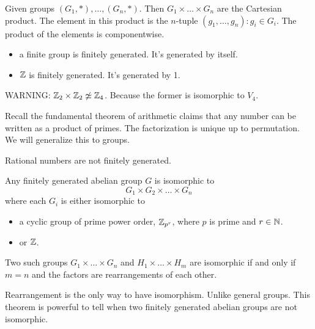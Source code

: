 \documentclass[class=article,crop=false]{standalone}
\begin{document}
\begin{defn}
	Given groups $ (G_1,*), \ldots, (G_n,*)$. Then $ G_1 \times \ldots \times G_n$ are the Cartesian product. The element in this product is the $ n$-tuple $ (g_1,\ldots,g_n): g_i \in G_i$. The product of the elements is componentwise. 
\end{defn}

\begin{note}[]
	\begin{itemize}
		\item a finite group is finitely generated. It's generated by itself.
		\item $ \mathbb{Z}$ is finitely generated. It's generated by 1.
	\end{itemize}
\end{note}

WARNING: $ \mathbb{Z}_2 \times \mathbb{Z}_2 \not \simeq \mathbb{Z}_4$. Because the former is isomorphic to $ V_4$.

Recall the fundamental theorem of arithmetic claims that any number can be written as a product of primes. The factorization is unique up to permutation. We will generalize this to groups.

\begin{note}[]
	Rational numbers are not finitely generated.
\end{note}
\begin{thm}
	Any finitely generated abelian group $ G$ is isomorphic to
	 \[
	G_1 \times G_2 \times \ldots \times G_n
	\] 
	where each $ G_i$ is either isomorphic to
	\begin{itemize}
		\item a cyclic group of prime power order, $ \mathbb{Z}_{p^r}$, where $ p$ is prime and  $ r \in \mathbb{N}$.
		\item or $ \mathbb{Z}$.
	\end{itemize}
	Two such groups $ G_1 \times \ldots \times G_n$ and $ H_1 \times \ldots \times H_m$ are isomorphic if and only if $ m=n$ and the factors are rearrangements of each other.
\end{thm}

\begin{note}[]
	Rearrangement is the only way to have isomorphism. Unlike general groups. This theorem is powerful to tell when two finitely generated abelian groups are not isomorphic.
\end{note}
\end{document}
